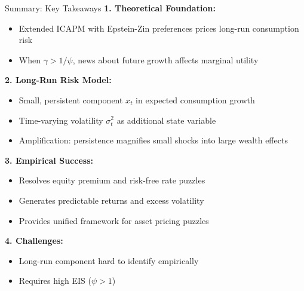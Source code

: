 \documentclass{beamer}
\begin{document}
\begin{frame}{Summary: Key Takeaways}
    \textbf{1. Theoretical Foundation:}
    \begin{itemize}
        \item Extended ICAPM with Epstein-Zin preferences prices long-run consumption risk
        \item When $\gamma > 1/\psi$, news about future growth affects marginal utility
    \end{itemize}
    
    \textbf{2. Long-Run Risk Model:}
    \begin{itemize}
        \item Small, persistent component $x_t$ in expected consumption growth
        \item Time-varying volatility $\sigma_t^2$ as additional state variable
        \item Amplification: persistence magnifies small shocks into large wealth effects
    \end{itemize}
    
    \textbf{3. Empirical Success:}
    \begin{itemize}
        \item Resolves equity premium and risk-free rate puzzles
        \item Generates predictable returns and excess volatility
        \item Provides unified framework for asset pricing puzzles
    \end{itemize}
    
    \textbf{4. Challenges:}
    \begin{itemize}
        \item Long-run component hard to identify empirically
        \item Requires high EIS ($\psi > 1$)
    \end{itemize}
\end{frame}
\end{document}
